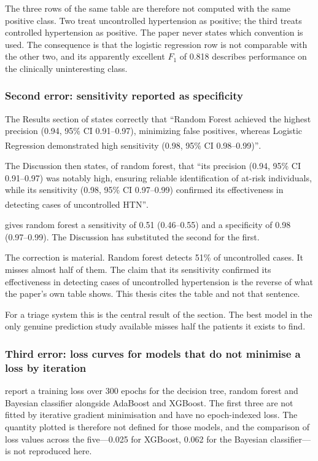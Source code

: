 \documentclass[12pt,a4paper,oneside]{report}
\newcommand{\bq}[1]{``#1''\textsuperscript{\dag}}
\begin{document}
The three rows of the same table are therefore not computed with the same positive class. Two treat uncontrolled hypertension as positive; the third treats controlled hypertension as positive. The paper never states which convention is used. The consequence is that the logistic regression row is not comparable with the other two, and its apparently excellent $F_1$ of 0.818 describes performance on the clinically uninteresting class.

\subsubsection{Second error: sensitivity reported as specificity}\label{sec:sens-spec}

The Results section of \textcite{mendoza2025} states correctly that \bq{Random Forest achieved the highest precision (0.94, 95\% CI 0.91--0.97), minimizing false positives, whereas Logistic Regression demonstrated high sensitivity (0.98, 95\% CI 0.98--0.99)}.

The Discussion then states, of random forest, that \bq{its precision (0.94, 95\% CI 0.91--0.97) was notably high, ensuring reliable identification of at-risk individuals, while its sensitivity (0.98, 95\% CI 0.97--0.99) confirmed its effectiveness in detecting cases of uncontrolled HTN}.

 gives random forest a sensitivity of 0.51 (0.46--0.55) and a specificity of 0.98 (0.97--0.99). The Discussion has substituted the second for the first.

The correction is material. Random forest detects 51\% of uncontrolled cases. It misses almost half of them. The claim that its sensitivity confirmed its effectiveness in detecting cases of uncontrolled hypertension is the reverse of what the paper's own table shows. This thesis cites the table and not that sentence.

For a triage system this is the central result of the section. The best model in the only genuine prediction study available misses half the patients it exists to find.

\subsubsection{Third error: loss curves for models that do not minimise a loss by iteration}

\Textcite{efendi2025} report a training loss over 300 epochs for the decision tree, random forest and Bayesian classifier alongside AdaBoost and XGBoost. The first three are not fitted by iterative gradient minimisation and have no epoch-indexed loss. The quantity plotted is therefore not defined for those models, and the comparison of loss values across the five---0.025 for XGBoost, 0.062 for the Bayesian classifier---is not reproduced here.
\end{document}
